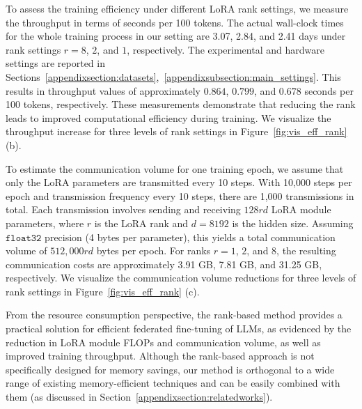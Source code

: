 \documentclass{article} %
\begin{document}
To assess the training efficiency under different LoRA rank settings, we measure the throughput in terms of seconds per 100 tokens. The actual wall-clock times for the whole training process in our setting are 3.07, 2.84, and 2.41 days under rank settings $r = 8$, $2$, and $1$, respectively. The experimental and hardware settings are reported in Sections~\ref{appendixsection:datasets},~\ref{appendixsubsection:main_settings}. This results in throughput values of approximately $0.864$, $0.799$, and $0.678$ seconds per 100 tokens, respectively. These measurements demonstrate that reducing the rank leads to improved computational efficiency during training. 
We visualize the throughput increase for three levels of rank settings in Figure~\ref{fig:vis_eff_rank} (b).

To estimate the communication volume for one training epoch, we assume that only the LoRA parameters are transmitted every 10 steps. With 10,000 steps per epoch and transmission frequency every 10 steps, there are 1,000 transmissions in total. Each transmission involves sending and receiving $128rd$ LoRA module parameters, where $r$ is the LoRA rank and $d = 8192$ is the hidden size. Assuming $\texttt{float32}$ precision (4 bytes per parameter), this yields a total communication volume of $512{,}000rd$ bytes per epoch. For ranks $r = 1$, $2$, and $8$, the resulting communication costs are approximately 3.91 GB, 7.81 GB, and 31.25 GB, respectively. We visualize the communication volume reductions for three levels of rank settings in Figure~\ref{fig:vis_eff_rank} (c).

From the resource consumption perspective, the rank-based method provides a practical solution for efficient federated fine-tuning of LLMs, as evidenced by the reduction in LoRA module FLOPs and communication volume, as well as improved training throughput. Although the rank-based approach is not specifically designed for memory savings, our method is orthogonal to a wide range of existing memory-efficient techniques and can be easily combined with them (as discussed in Section~\ref{appendixsection:relatedworks}).
\end{document}
